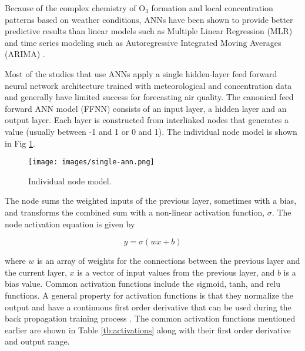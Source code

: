 Because of the complex chemistry of O$_{3}$ formation and local concentration patterns based on weather conditions, ANNs have been shown to provide better predictive results than linear models such as Multiple Linear Regression (MLR) and time series modeling such as Autoregressive Integrated Moving Averages (ARIMA) \citep{Gardner1998, Prybutok2000}. 

Most of the studies that use ANNs apply a single hidden-layer feed forward neural network architecture trained with meteorological and concentration data and generally have limited success for forecasting air quality. The canonical feed forward ANN model (FFNN) consists of an input layer, a hidden layer and an output layer. Each layer is constructed from interlinked nodes that generates a value (usually between -1 and 1 or 0 and 1). The individual node model is shown in Fig \ref{fig:SingleANN}. \\
%
\begin{figure}
\centering
\texttt{[image: images/single-ann.png]} 
\caption{Individual node model.}
\label{fig:SingleANN}
\end{figure}
%
The node sums the weighted inputs of the previous layer, sometimes with a bias, and transforms the combined sum with a non-linear activation function, $\sigma$. The node activation equation is given by

\begin{equation}
\label{eq:perceptron}
y= \sigma(wx+b)
\end{equation}

\noindent
where $w$ is an array of weights for the connections between the previous layer and the current layer, $x$ is a vector of input values from the previous layer, and $b$ is a bias value. Common activation functions include the sigmoid, tanh, and relu functions. A general property for activation functions is that they normalize the output and have a continuous first order derivative that can be used during the back propagation training process \citep{Goodfellow2016}. The common activation functions mentioned earlier are shown in Table \ref{tb:activations} along with their first order derivative and output range.

